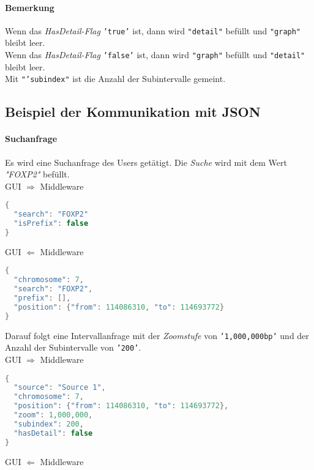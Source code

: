 \documentclass{scrartcl}
\begin{document}
\paragraph{Bemerkung} Wenn das \textit{HasDetail-Flag} \texttt{'true'} ist, dann wird \texttt{"detail"} befüllt und \texttt{"graph"} bleibt leer.\\
Wenn das \textit{HasDetail-Flag} \texttt{'false'} ist, dann wird \texttt{"graph"} befüllt und \texttt{"detail"} bleibt leer.\\
Mit \texttt{"'subindex"} ist die Anzahl der Subintervalle gemeint.
\newpage
\subsection{Beispiel der Kommunikation mit JSON}
\paragraph{Suchanfrage} Es wird eine Suchanfrage des Users getätigt. Die \textit{Suche} wird mit dem Wert \textit{"FOXP2"} befüllt.\\
\newline
GUI $\Rightarrow$ Middleware
\begin{lstlisting}[language=c,
commentstyle=\fontsize{12}{14.4}\selectfont,
basicstyle=\ttfamily\fontsize{10}{12}\selectfont, showstringspaces=false]
{
  "search": "FOXP2"
  "isPrefix": false
}
\end{lstlisting}
GUI $\Leftarrow$ Middleware
\begin{lstlisting}[language=c,
commentstyle=\fontsize{12}{14.4}\selectfont,
basicstyle=\ttfamily\fontsize{10}{12}\selectfont, showstringspaces=false]
{
  "chromosome": 7,
  "search": "FOXP2",
  "prefix": [],
  "position": {"from": 114086310, "to": 114693772}
}
\end{lstlisting}
Darauf folgt eine Intervallanfrage mit der \textit{Zoomstufe} von \texttt{'1,000,000bp'} und der Anzahl der Subintervalle von \texttt{'200'}.\\
\newline
GUI $\Rightarrow$ Middleware
\begin{lstlisting}[language=c,
commentstyle=\fontsize{12}{14.4}\selectfont,
basicstyle=\ttfamily\fontsize{10}{12}\selectfont, showstringspaces=false]
{
  "source": "Source 1",
  "chromosome": 7,
  "position": {"from": 114086310, "to": 114693772},
  "zoom": 1,000,000,
  "subindex": 200,
  "hasDetail": false
}
\end{lstlisting}
GUI $\Leftarrow$ Middleware
\end{document}
